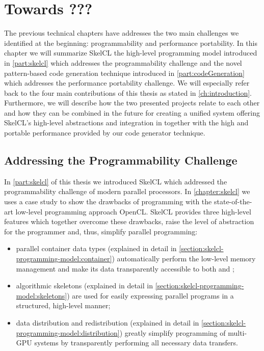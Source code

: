 
\chapter{Towards ???}

\label{ch:seventh} %

The previous technical chapters have addresses the two main challenges we identified at the beginning: programmability and performance portability.
In this chapter we will summarize SkelCL the high-level programming model introduced in \autoref{part:skelcl} which addresses the programmability challenge and the novel pattern-based code generation technique introduced in \autoref{part:codeGeneration} which addresses the performance portability challenge.
We will especially refer back to the four main contributions of this thesis as stated in \autoref{ch:introduction}.
Furthermore, we will describe how the two presented projects relate to each other and how they can be combined in the future for creating a unified system offering SkelCL's high-level abstractions and integration in \Cpp together with the high and portable performance provided by our code generator technique.

\section{Addressing the Programmability Challenge}
In \autoref{part:skelcl} of this thesis we introduced SkelCL which addressed the programmability challenge of modern parallel processors.
In \autoref{chapter:skelcl} we uses a case study to show the drawbacks of programming with the state-of-the-art low-level programming approach OpenCL.
SkelCL provides three high-level features which together overcome these drawbacks, raise the level of abstraction for the programmer and, thus, simplify parallel programming:
\begin{itemize}
  \item parallel container data types (explained in detail in \autoref{section:skelcl-programming-model:container}) automatically perform the low-level memory management and make its data transparently accessible to both \CPU and \GPUs;
  \item algorithmic skeletons (explained in detail in \autoref{section:skelcl-programming-model:skeletons}) are used for easily expressing parallel programs in a structured, high-level manner;
  \item data distribution and redistribution (explained in detail in \autoref{section:skelcl-programming-model:distribution}) greatly simplify programming of multi-GPU systems by transparently performing all necessary data transfers.
\end{itemize}

